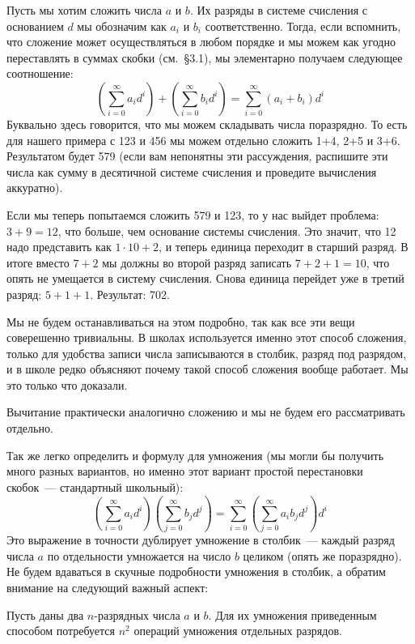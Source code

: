 Пусть мы хотим сложить числа $a$ и $b$. Их разряды в системе счисления с основанием $d$ мы обозначим как $a_i$ и $b_i$ соответственно. Тогда, если вспомнить, что сложение может осуществляться в любом порядке и мы можем как угодно переставлять в суммах скобки (см.~\S3.1), мы элементарно получаем следующее соотношение:
$$\left(\sum_{i=0}^\infty a_i d^i\right) + \left(\sum_{i=0}^\infty b_i d^i\right) = \sum_{i=0}^\infty (a_i + b_i) d^i$$
Буквально здесь говорится, что мы можем складывать числа поразрядно. То есть для нашего примера с 123 и 456 мы можем отдельно сложить 1+4, 2+5 и 3+6. Результатом будет 579 (если вам непонятны эти рассуждения, распишите эти числа как сумму в десятичной системе счисления и проведите вычисления аккуратно).

Если мы теперь попытаемся сложить 579 и 123, то у нас выйдет проблема: $3+9=12$, что больше, чем основание системы счисления. Это значит, что 12 надо представить как $1\cdot10 + 2$, и теперь единица переходит в старший разряд. В итоге вместо $7+2$ мы должны во второй разряд записать $7+2+1=10$, что опять не умещается в систему счисления. Снова единица перейдет уже в третий разряд: $5+1+1$. Результат: 702.

Мы не будем останавливаться на этом подробно, так как все эти вещи соверешенно тривиальны. В школах используется именно этот способ сложения, только для удобства записи числа записываются в столбик, разряд под разрядом, и в школе редко объясняют почему такой способ сложения вообще работает. Мы это только что доказали.

Вычитание практически аналогично сложению и мы не будем его рассматривать отдельно.

Так же легко определить и формулу для умножения (мы могли бы получить много разных вариантов, но именно этот вариант простой перестановки скобок~--- стандартный школьный):
$$\left(\sum_{i=0}^\infty a_i d^i \right)\left( \sum_{j=0}^\infty b_j d^j \right) = \sum_{i=0}^\infty \left(\sum_{j=0}^\infty a_i b_j d^j \right)d^i$$
Это выражение в точности дублирует умножение в столбик~--- каждый разряд числа $a$ по отдельности умножается на число $b$ целиком (опять же поразрядно). Не будем вдаваться в скучные подробности умножения в столбик, а обратим внимание на следующий важный аспект:

\begin{exercise}
Пусть даны два $n$-разрядных числа $a$ и $b$. Для их умножения приведенным способом потребуется $n^2$ операций умножения отдельных разрядов.
\end{exercise}

